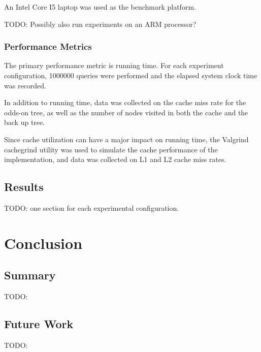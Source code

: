 \documentclass[mcs]{scsthesis}
\begin{document}
An Intel Core I5 laptop was used as the benchmark platform.

TODO: Possibly also run experiments on an ARM processor?

\subsection{Performance Metrics}

The primary performance metric is running time.  For each experiment
configuration, 1000000 queries were performed and the elapsed system clock
time was recorded.

In addition to running time, data was collected on the cache miss rate for the
odds-on tree, as well as the number of nodes visited in both the cache and the
back up tree.

Since cache utilization can have a major impact on running time, the Valgrind
\cite{valgrind} cachegrind utility was used to simulate the cache performance
of the implementation, and data was collected on L1 and L2 cache miss rates.

\section{Results}

TODO: one section for each experimental configuration.

\chapter{Conclusion}

\section{Summary}

TODO:

\section{Future Work}

TODO:
\end{document}

